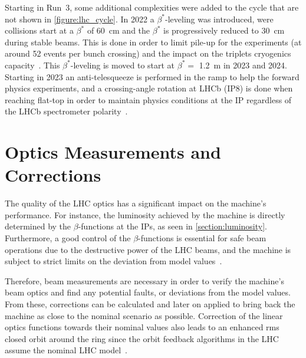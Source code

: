 Starting in Run~\num{3}, some additional complexities were added to the cycle that are not shown in \cref{figure:lhc_cycle}.
In \num{2022} a \(\beta^{\ast}\)-leveling was introduced, were collisions start at a \(\beta^{\ast}\) of \qty{60}{\centi\meter} and the \(\beta^{\ast}\) is progressively reduced to \qty{30}{\centi\meter} during stable beams.
This is done in order to limit pile-up for the experiments (at around \num{52} events per bunch crossing) and the impact on the triplets cryogenics capacity~\cite{CERN:Fartoukh:LHC_Config_Run3, CERN:Ferlin:Cryogenics}.
This \(\beta^{\ast}\)-leveling is moved to start at \(\beta^{\ast} =\) \qty{1.2}{\meter} in \num{2023} and \num{2024}.
Starting in \num{2023} an anti-telesqueeze is performed in the ramp to help the forward physics experiments, and a crossing-angle rotation at LHCb (IP\num{8}) is done when reaching flat-top in order to maintain physics conditions at the IP regardless of the LHCb spectrometer polarity~\cite{CERN:Fartoukh:LHC_Config_Run3}.


\section{Optics Measurements and Corrections}
\label{section:optics_measurements_and_corrections}

The quality of the LHC optics has a significant impact on the machine's performance.
For instance, the luminosity achieved by the machine is directly determined by the \(\beta\)-functions at the IPs, as seen in \cref{section:luminosity}.
Furthermore, a good control of the \(\beta\)-functions is essential for safe beam operations due to the destructive power of the LHC beams, and the machine is subject to strict limits on the deviation from model values~\cite{CERN:Bruning:Field_Quality_Spec_LHC_Main_Dipoles}.

Therefore, beam measurements are necessary in order to verify the machine's beam optics and find any potential faults, or deviations from the model values.
From these, corrections can be calculated and later on applied to bring back the machine as close to the nominal scenario as possible.
Correction of the linear optics functions towards their nominal values also leads to an enhanced rms closed orbit around the ring since the orbit feedback algorithms in the LHC assume the nominal LHC model~\cite{PRAB:Tomas:Record_Low_Beta_Beating_in_the_LHC, PRAB:Persson:LHC_Optics_Commissioning_OnePercent}.


